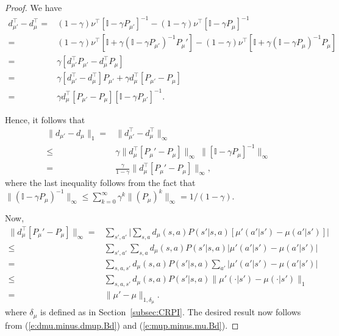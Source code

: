 \documentclass[twoside]{article}
\theoremstyle{plain}
\theoremstyle{definition}
\theoremstyle{remark}
\newcommand{\tr}{\top}
\newcommand{\bI}{\mathbb{I}}
\newcommand{\mup}{\mu'}
\renewcommand{\eqref}[1]{(\ref{#1})}
\begin{document}
\begin{proof}
    We have
    \begin{align*}
        d_{\mup}^\tr - d_{\mu}^\tr = {} & (1 - \gamma) \nu^\tr[\bI - \gamma P_{\mup}]^{-1} -  (1 -  \gamma) \nu^\tr [\bI - \gamma P_\mu]^{-1} \\
        = {} & (1 - \gamma) \nu^\tr [\bI + \gamma  (\bI - \gamma P_{\mup})^{-1} P_\mup] -  (1 -  \gamma) \nu^\tr [\bI + \gamma (\bI- \gamma P_\mu)^{-1} P_\mu ]\\
        = {} & \gamma [d_{\mup}^\tr P_{\mup} - d_{\mu}^\tr P_{\mu}] \\
        = {} & \gamma [d_{\mup}^\tr - d_{\mu}^\tr ]P_{\mup} + \gamma d_{\mu}^\tr [P_{\mup} - P_{\mu}] \\
        = {} & \gamma d_{\mu}^\tr [P_{\mup} - P_{\mu}] [\bI - \gamma P_{\mup}]^{-1}.
    \end{align*}
    
    Hence, it follows that 
    \begin{align}
        \|d_{\mup} - d_{\mu}\|_1 = {} & \|d_{\mup}^\tr - d_{\mu}^\tr\|_\infty \nonumber \\
        \leq  {} & \gamma \|d_{\mu}^\tr [P_\mup - P_{\mu}]\|_\infty\ \|[\bI - \gamma P_{\mu}]^{-1}\|_\infty \nonumber \\
        = {} & \frac{\gamma}{1 - \gamma } \|d_{\mu}^\tr [P_\mup - P_{\mu}]\|_\infty,
        \label{e:dmu.minus.dmup.Bd}
    \end{align}
    where the last inequality follows from the fact that $\|(\bI - \gamma P_\mu)^{-1}\|_\infty \leq \sum_{k = 0}^\infty \gamma^k \|(P_\mu)^k\|_\infty = 1/(1 - \gamma).$

    Now, 
    \begin{align}
        \|d_{\mu}^\tr [P_\mup - P_\mu]\|_\infty = {} & \sum_{s', a'} \Big|\sum_{s, a} d_\mu(s, a)   P(s'|s, a) [\mup(a'|s') - \mu(a'|s')] \Big| \nonumber \\
        \leq {} & \sum_{s', a'} \sum_{s, a} d_{\mu}(s, a) P(s'|s, a) \Big|\mup(a'|s') - \mu(a'|s') \Big| \nonumber \\
        = {} & \sum_{s, a, s'} d_{\mu}(s, a) P(s'|s, a) \sum_{a'}  \Big|\mup(a'|s') - \mu(a'|s') \Big| \nonumber \\
        \leq {} & \sum_{s, a, s'} d_{\mu}(s, a) P(s'|s, a)  \|\mup(\cdot|s') - \mu(\cdot|s')\|_1 \nonumber\\
        = {} & \|\mup - \mu\|_{1, \delta_\mu} \label{e:mup.minus.mu.Bd}.
    \end{align}
    where $\delta_\mu$ is defined as in Section~\ref{subsec:CRPI}. The desired result now follows from \eqref{e:dmu.minus.dmup.Bd} and \eqref{e:mup.minus.mu.Bd}.
%
\end{proof}
\end{document}
